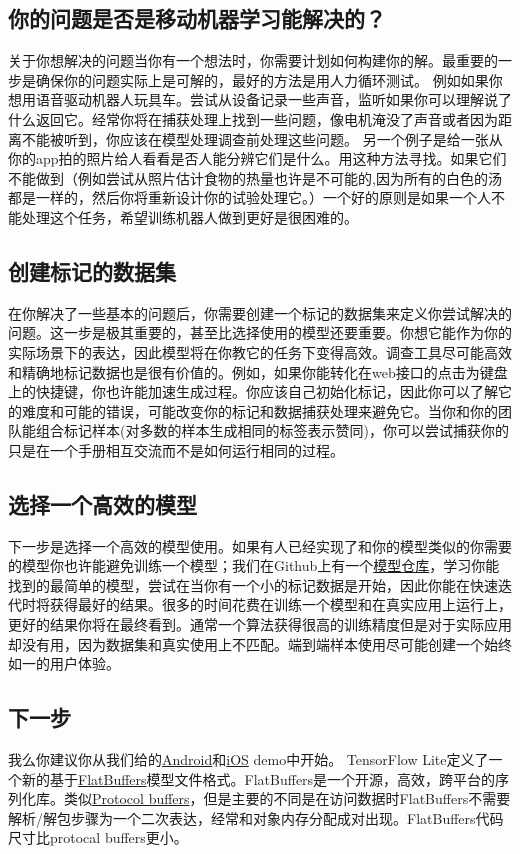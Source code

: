 \subsection{你的问题是否是移动机器学习能解决的？}
关于你想解决的问题当你有一个想法时，你需要计划如何构建你的解。最重要的一步是确保你的问题实际上是可解的，最好的方法是用人力循环测试。
例如如果你想用语音驱动机器人玩具车。尝试从设备记录一些声音，监听如果你可以理解说了什么返回它。经常你将在捕获处理上找到一些问题，像电机淹没了声音或者因为距离不能被听到，你应该在模型处理调查前处理这些问题。
另一个例子是给一张从你的app拍的照片给人看看是否人能分辨它们是什么。用这种方法寻找。如果它们不能做到（例如尝试从照片估计食物的热量也许是不可能的,因为所有的白色的汤都是一样的，然后你将重新设计你的试验处理它。）一个好的原则是如果一个人不能处理这个任务，希望训练机器人做到更好是很困难的。
\subsection{创建标记的数据集}
在你解决了一些基本的问题后，你需要创建一个标记的数据集来定义你尝试解决的问题。这一步是极其重要的，甚至比选择使用的模型还要重要。你想它能作为你的实际场景下的表达，因此模型将在你教它的任务下变得高效。调查工具尽可能高效和精确地标记数据也是很有价值的。例如，如果你能转化在web接口的点击为键盘上的快捷键，你也许能加速生成过程。你应该自己初始化标记，因此你可以了解它的难度和可能的错误，可能改变你的标记和数据捕获处理来避免它。当你和你的团队能组合标记样本(对多数的样本生成相同的标签表示赞同)，你可以尝试捕获你的只是在一个手册相互交流而不是如何运行相同的过程。
\subsection{选择一个高效的模型}
下一步是选择一个高效的模型使用。如果有人已经实现了和你的模型类似的你需要的模型你也许能避免训练一个模型；我们在Github上有一个\href{https://github.com/tensorflow/models}{模型仓库}，学习你能找到的最简单的模型，尝试在当你有一个小的标记数据是开始，因此你能在快速迭代时将获得最好的结果。很多的时间花费在训练一个模型和在真实应用上运行上，更好的结果你将在最终看到。通常一个算法获得很高的训练精度但是对于实际应用却没有用，因为数据集和真实使用上不匹配。端到端样本使用尽可能创建一个始终如一的用户体验。
\subsection{下一步}
我么你建议你从我们给的\href{https://www.tensorflow.org/mobile/android_build?hl=zh-cn}{Android}和\href{https://www.tensorflow.org/mobile/ios_build?hl=zh-cn}{iOS} demo中开始。
TensorFlow Lite定义了一个新的基于\href{https://google.github.io/flatbuffers/}{FlatBuffers}模型文件格式。FlatBuffers是一个开源，高效，跨平台的序列化库。类似\href{https://developers.google.com/protocol-buffers/?hl=en}{Protocol buffers}，但是主要的不同是在访问数据时FlatBuffers不需要解析/解包步骤为一个二次表达，经常和对象内存分配成对出现。FlatBuffers代码尺寸比protocal buffers更小。

